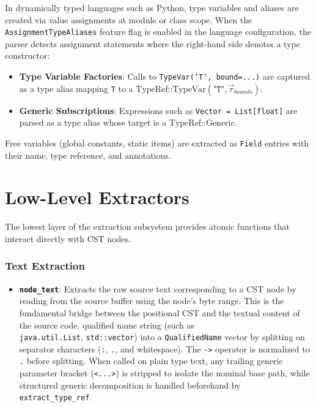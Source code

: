 In dynamically typed languages such as Python, type variables and aliases
are created via value assignments at module or class scope. When the \\
\texttt{AssignmentTypeAliases} feature flag is enabled in the language
configuration, the parser detects assignment statements where the right-hand
side denotes a type constructor:
\begin{itemize}
  \item \textbf{Type Variable Factories}: Calls to
    \texttt{TypeVar('T', bound=...)}
    are captured as a type alias mapping \texttt{T} to a
    $\text{TypeRef::TypeVar}(\texttt{"T"}, \vec{\tau}_{bounds})$.
  \item \textbf{Generic Subscriptions}: Expressions such as
    \texttt{Vector = List[float]} are parsed as a type alias whose target is a
    $\text{TypeRef::Generic}$.
\end{itemize}

Free variables (global constants, static items) are extracted as
\texttt{Field} entries with their name, type reference, and annotations.

\section{Low-Level Extractors}
\label{sec:extractors}

The lowest layer of the extraction subsystem provides atomic
functions that interact directly with CST nodes.

\subsubsection{Text Extraction}

\begin{itemize}
  \item \textbf{\texttt{node\_text}}: Extracts the raw source text
    corresponding to a CST node by reading from the source buffer
    using the node's byte range. This is the fundamental bridge
    between the positional CST and the textual content of the source code.
    qualified name string (such as \\ \texttt{java.util.List},
    \texttt{std::vector})
    into a \texttt{QualifiedName} vector by
    splitting on separator characters (\texttt{:}, \texttt{.}, and
    whitespace). The \texttt{->} operator is normalized to \texttt{.}
    before splitting. When called on plain type text, any trailing generic
    parameter bracket (\texttt{<...>}) is stripped to isolate the
    nominal base path,
    while structured generic decomposition is handled beforehand by
    \texttt{extract\_type\_ref}.
\end{itemize}

